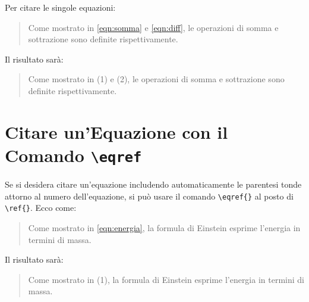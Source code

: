 Per citare le singole equazioni:

\begin{quote}
	Come mostrato in \ref{eqn:somma} e \ref{eqn:diff}, le operazioni di somma e sottrazione sono definite rispettivamente.
\end{quote}

Il risultato sarà:

\begin{quote}
	Come mostrato in (1) e (2), le operazioni di somma e sottrazione sono definite rispettivamente.
\end{quote}

\section{Citare un'Equazione con il Comando \texttt{\textbackslash eqref}}

Se si desidera citare un'equazione includendo automaticamente le parentesi tonde attorno al numero dell'equazione, si può usare il comando \verb|\eqref{}| al posto di \verb|\ref{}|. Ecco come:

\begin{quote}
	Come mostrato in \eqref{eqn:energia}, la formula di Einstein esprime l'energia in termini di massa.
\end{quote}

Il risultato sarà:

\begin{quote}
	Come mostrato in (1), la formula di Einstein esprime l'energia in termini di massa.
\end{quote}
